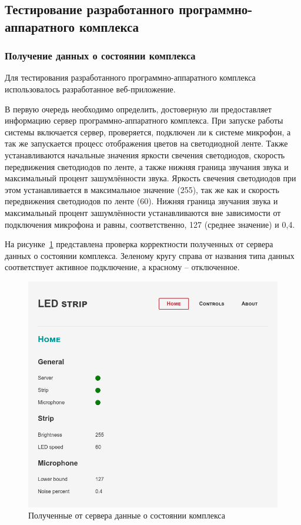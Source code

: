\subsection{Тестирование разработанного программно-аппаратного комплекса}

\subsubsection{Получение данных о состоянии комплекса}

Для тестирования разработанного программно-аппаратного комплекса использовалось разработанное веб-приложение.

В первую очередь необходимо определить, достоверную ли предоставляет информацию сервер программно-аппаратного комплекса. При запуске работы системы включается сервер, проверяется, подключен ли к системе микрофон, а так же запускается процесс отображения цветов на светодиодной ленте. Также устанавливаются начальные значения яркости свечения светодиодов, скорость передвижения светодиодов по ленте, а также нижняя граница звучания звука и максимальный процент зашумлённости звука. Яркость свечения светодиодов при этом устанавливается в максимальное значение (255), так же как и скорость передвижения светодиодов по ленте (60). Нижняя граница звучания звука и максимальный процент зашумлённости устанавливаются вне зависимости от подключения микрофона и равны, соответственно, 127 (среднее значение) и 0,4.

На рисунке~\ref{img:test__home-on} представлена проверка корректности полученных от сервера данных о состоянии комплекса. Зеленому кругу справа от названия типа данных соответствует активное подключение, а красному -- отключенное.

\begin{figure}[H]
  \centering
  \includegraphics[height=0.3\textheight]{assets/images/practical/test__home-on.png}
  \caption{Полученные от сервера данные о состоянии комплекса}
  \label{img:test__home-on}
\end{figure}


